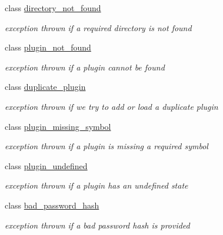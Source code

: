 \begin{DoxyCompactItemize}
class \hyperlink{classpion_1_1error_1_1directory__not__found}{directory\-\_\-not\-\_\-found}
\begin{DoxyCompactList}\small\item\em exception thrown if a required directory is not found \end{DoxyCompactList}\item 
class \hyperlink{classpion_1_1error_1_1plugin__not__found}{plugin\-\_\-not\-\_\-found}
\begin{DoxyCompactList}\small\item\em exception thrown if a plugin cannot be found \end{DoxyCompactList}\item 
class \hyperlink{classpion_1_1error_1_1duplicate__plugin}{duplicate\-\_\-plugin}
\begin{DoxyCompactList}\small\item\em exception thrown if we try to add or load a duplicate plugin \end{DoxyCompactList}\item 
class \hyperlink{classpion_1_1error_1_1plugin__missing__symbol}{plugin\-\_\-missing\-\_\-symbol}
\begin{DoxyCompactList}\small\item\em exception thrown if a plugin is missing a required symbol \end{DoxyCompactList}\item 
class \hyperlink{classpion_1_1error_1_1plugin__undefined}{plugin\-\_\-undefined}
\begin{DoxyCompactList}\small\item\em exception thrown if a plugin has an undefined state \end{DoxyCompactList}\item 
class \hyperlink{classpion_1_1error_1_1bad__password__hash}{bad\-\_\-password\-\_\-hash}
\begin{DoxyCompactList}\small\item\em exception thrown if a bad password hash is provided \end{DoxyCompactList}\end{DoxyCompactItemize}
